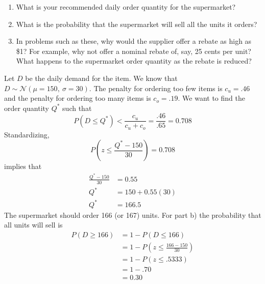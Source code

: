 \begin{enumerate}
\begin{enumerate}
\item What is your recommended daily order quantity for the
  supermarket?
\item What is the probability that the supermarket will sell all the
  units it orders?
\item In problems such as these, why would the supplier offer a rebate
  as high as \$1? For example, why not offer a nominal rebate of, say,
  25 cents per unit? What happens to the supermarket order quantity as
  the rebate is reduced? \label{rebate}
\end{enumerate}

\begin{solution}
\bs Let $D$ be the daily demand for the item. We know that
$D \sim \mathcal{N}\left(\mu=150,~\sigma=30\right)$. The penalty
for ordering too few items is $c_u=.46$ and the penalty for
ordering too many items is $c_o=.19$. We want to find the
order quantity $Q^{\ast}$ such that
\[ P\left(D \leq Q^{\ast}\right) < \frac{c_u}{c_u+c_o} = \frac{.46}{.65} = 0.708 \]
Standardizing,
\[ P\left(z \leq \frac{Q^{\ast}-150}{30}\right) = 0.708 \]
implies that
\begin{align*}
\frac{Q^{\ast}-150}{30} &= 0.55 \\
Q^{\ast} &= 150 + 0.55(30)\\
Q^{\ast} &= 166.5
\end{align*}
The supermarket should order 166 (or 167) units.  
For part b) the probability that all units will sell is
\begin{align*}
  P\left(D \geq 166 \right) &= 1 - P\left(D \leq 166 \right)\\
                            &= 1 - P\left( z \leq \frac{166-150}{30} \right) \\
                            &= 1 - P\left( z \leq .5333\right)\\
                            &= 1 - .70 \\
                            &= 0.30
\end{align*}


\end{solution}
\end{enumerate}
